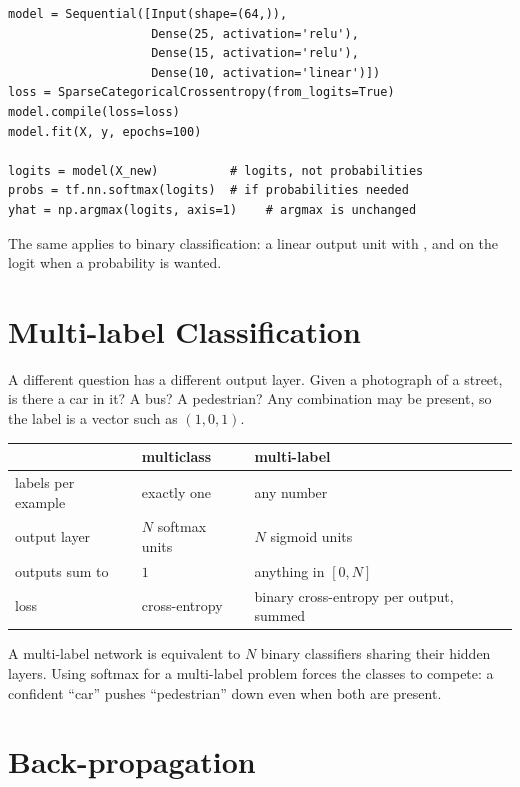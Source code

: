 \begin{lstlisting}[style=tfkeras, caption={The recommended multiclass set-up.}, label={lst:from-logits}]
model = Sequential([Input(shape=(64,)),
                    Dense(25, activation='relu'),
                    Dense(15, activation='relu'),
                    Dense(10, activation='linear')])
loss = SparseCategoricalCrossentropy(from_logits=True)
model.compile(loss=loss)
model.fit(X, y, epochs=100)

logits = model(X_new)          # logits, not probabilities
probs = tf.nn.softmax(logits)  # if probabilities needed
yhat = np.argmax(logits, axis=1)    # argmax is unchanged
\end{lstlisting}

The same applies to binary classification: a linear output unit with
, and  on the
logit when a probability is wanted.

\section{Multi-label Classification}
\label{sec:multilabel}

A different question has a different output layer. Given a photograph of a
street, is there a car in it? A bus? A pedestrian? Any combination may be
present, so the label is a vector such as $(1, 0, 1)$.

\begin{center}
\small
\renewcommand{\arraystretch}{1.3}
\begin{tabular}{@{}L{3.2cm}L{3.8cm}L{3.8cm}@{}}
\toprule
 & multiclass & multi-label\\
\midrule
labels per example & exactly one & any number\\
output layer & $N$ softmax units & $N$ sigmoid units\\
outputs sum to & $1$ & anything in $[0, N]$\\
loss & cross-entropy & binary cross-entropy per output, summed\\
\bottomrule
\end{tabular}
\end{center}

A multi-label network is equivalent to $N$ binary classifiers sharing their
hidden layers. Using softmax for a multi-label problem forces the classes to
compete: a confident ``car'' pushes ``pedestrian'' down even when both are
present.

\section{Back-propagation}
\label{sec:backprop}

